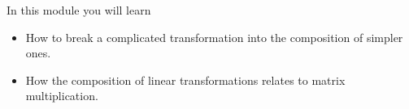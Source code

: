 	\begin{bookonly}\begin{center}\hspace{-2cm}\triplegrid\end{center}\end{bookonly}
\begin{module}

	In this module you will learn
	\begin{itemize}
		\item How to break a complicated transformation into the composition
			of simpler ones.
		\item How the composition of linear transformations relates to matrix multiplication.
	\end{itemize}

	
	
\end{module}
